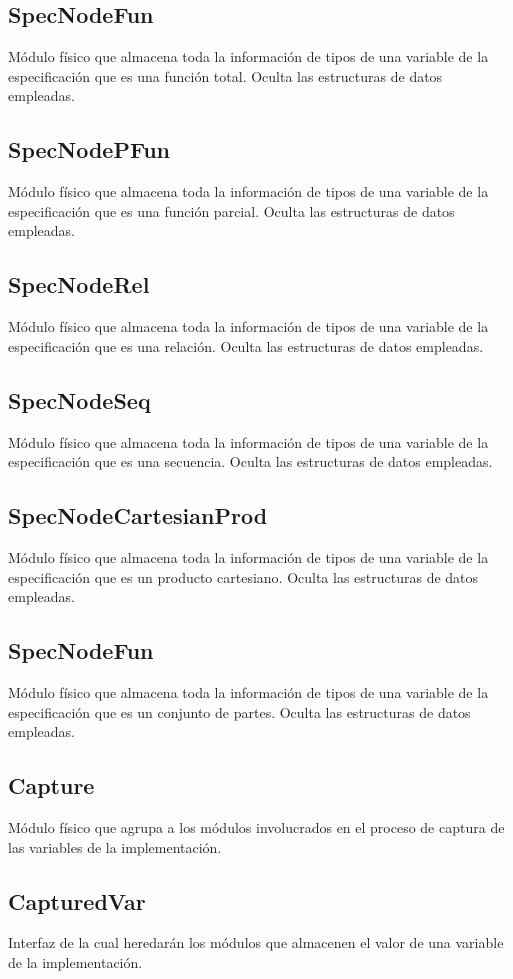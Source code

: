 \documentclass[a4paper,10pt]{report}
\begin{document}
				\subsection{SpecNodeFun}
				Módulo físico que almacena toda la información de tipos de una variable de la especificación que es una función total. Oculta las estructuras de datos empleadas.
				\subsection{SpecNodePFun}
				Módulo físico que almacena toda la información de tipos de una variable de la especificación que es una función parcial. Oculta las estructuras de datos empleadas.
				\subsection{SpecNodeRel}
				Módulo físico que almacena toda la información de tipos de una variable de la especificación que es una relación. Oculta las estructuras de datos empleadas.
				\subsection{SpecNodeSeq}
				Módulo físico que almacena toda la información de tipos de una variable de la especificación que es una secuencia. Oculta las estructuras de datos empleadas.
				\subsection{SpecNodeCartesianProd}
				Módulo físico que almacena toda la información de tipos de una variable de la especificación que es un producto cartesiano. Oculta las estructuras de datos empleadas.
				\subsection{SpecNodeFun}
				Módulo físico que almacena toda la información de tipos de una variable de la especificación que es un conjunto de partes. Oculta las estructuras de datos empleadas.
		\subsection{Capture}
		Módulo físico que agrupa a los módulos involucrados en el proceso de captura de las variables de la implementación.
			\subsection{CapturedVar}
			Interfaz de la cual heredarán los módulos que almacenen el valor de una variable de la implementación.
\end{document}
